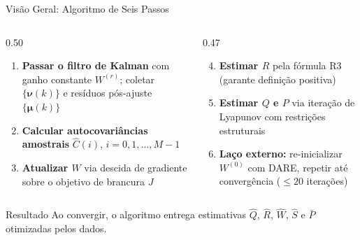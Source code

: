 \documentclass[aspectratio=169]{beamer}
\begin{document}
\begin{frame}{Visão Geral: Algoritmo de Seis Passos}
    \begin{columns}[T]
        \begin{column}{0.50\textwidth}
            \begin{enumerate}
                \item \textbf{Passar o filtro de Kalman} com ganho constante
                      $W^{(r)}$; coletar $\{\boldsymbol{\nu}(k)\}$ e resíduos
                      pós-ajuste $\{\boldsymbol{\mu}(k)\}$
                \item \textbf{Calcular autocovariâncias amostrais} $\hat{C}(i)$,
                      $i = 0,1,\ldots,M-1$
                \item \textbf{Atualizar $W$} via descida de gradiente sobre o
                      objetivo de brancura $J$
            \end{enumerate}
        \end{column}
        \begin{column}{0.47\textwidth}
            \begin{enumerate}
                \setcounter{enumi}{3}
                \item \textbf{Estimar $R$} pela fórmula R3 (garante
                      definição positiva)
                \item \textbf{Estimar $Q$ e $P$} via iteração de Lyapunov
                      com restrições estruturais
                \item \textbf{Laço externo:} re-inicializar $W^{(0)}$ com
                      DARE, repetir até convergência ($\leq 20$ iterações)
            \end{enumerate}
        \end{column}
    \end{columns}
    \vspace{0.3cm}
    \begin{block}{Resultado}
        Ao convergir, o algoritmo entrega estimativas $\hat{Q}$, $\hat{R}$,
        $\hat{W}$, $\hat{S}$ e $\bar{P}$ otimizadas pelos dados.
    \end{block}
\end{frame}
\end{document}
